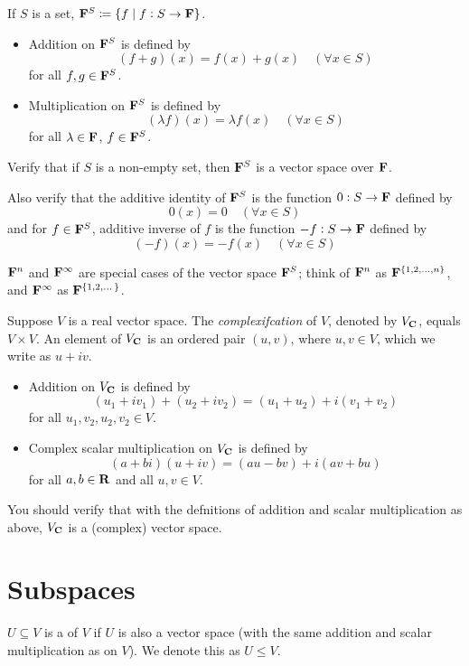 \begin{example}
If $S$ is a set, $\mathbf F^S\coloneqq\{f\mid f:S\to\mathbf F\}$.
\begin{itemize}
\item Addition on $\mathbf F^S$ is defined by 
\[(f+g)(x)=f(x)+g(x)\quad(\forall x\in S)\]
for all $f,g\in\mathbf F^S$.
\item Multiplication on $\mathbf F^S$ is defined by
\[(\lambda f)(x)=\lambda f(x)\quad(\forall x\in S)\]
for all $\lambda\in\mathbf F$, $f\in\mathbf F^S$.
\end{itemize}

Verify that if $S$ is a non-empty set, then $\mathbf F^S$ is a vector space over $\mathbf F$.

Also verify that the additive identity of $\mathbf F^S$ is the function $0:S\to\mathbf F$ defined by
\[0(x)=0\quad(\forall x\in S)\]
and for $f\in\mathbf F^S$, additive inverse of $f$ is the function $-f:S\to\mathbf F$ defined by
\[(-f)(x)=-f(x)\quad(\forall x\in S)\]
\end{example}

\begin{remark}
$\mathbf F^n$ and $\mathbf F^\infty$ are special cases of the vector space $\mathbf F^S$; think of $\mathbf F^n$ as $\mathbf F^{\{1,2,\dots,n\}}$, and $\mathbf F^\infty$ as $\mathbf F^{\{1,2,\dots\}}$.
\end{remark}

\begin{example}[Complexification]
Suppose $V$ is a real vector space. The \emph{complexifcation} of $V$, denoted by $V_\mathbf C$, equals $V\times V$. An element of $V_\mathbf C$ is an ordered pair $(u,v)$, where $u,v\in V$, which we write as $u+iv$.
\begin{itemize}
\item Addition on $V_\mathbf C$ is defined by
\[(u_1+iv_1)+(u_2+iv_2)=(u_1+u_2)+i(v_1+v_2)\]
for all $u_1,v_2,u_2,v_2\in V$.
\item Complex scalar multiplication on $V_\mathbf C$ is defined by
\[(a+bi)(u+iv)=(au-bv)+i(av+bu)\]
for all $a,b\in\mathbf R$ and all $u,v\in V$.
\end{itemize}
You should verify that with the defnitions of addition and scalar multiplication as above, $V_\mathbf C$ is a (complex) vector space.
\end{example}

\section{Subspaces}
\begin{definition}[Subspace]
$U\subseteq V$ is a  of $V$ if $U$ is also a vector space (with the same addition and scalar multiplication as on $V$). We denote this as $U\le V$.
\end{definition}

